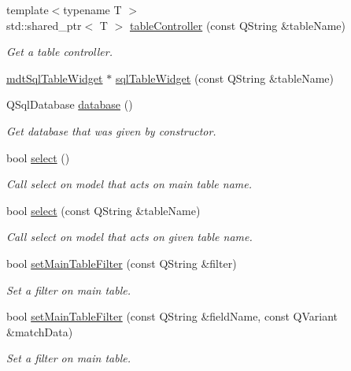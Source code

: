 \begin{DoxyCompactItemize}
{\footnotesize template$<$typename T $>$ }\\std\-::shared\-\_\-ptr$<$ T $>$ \hyperlink{classmdt_sql_form_ae812518bc0c786b918dbc63bc8a69741}{table\-Controller} (const Q\-String \&table\-Name)
\begin{DoxyCompactList}\small\item\em Get a table controller. \end{DoxyCompactList}\item 
\hyperlink{classmdt_sql_table_widget}{mdt\-Sql\-Table\-Widget} $\ast$ \hyperlink{classmdt_sql_form_a6a17f32077fb7cc33139c3dc26a8d011}{sql\-Table\-Widget} (const Q\-String \&table\-Name)
\item 
Q\-Sql\-Database \hyperlink{classmdt_sql_form_ac8423f91a1f8a6fa7408cd61be86a89c}{database} ()
\begin{DoxyCompactList}\small\item\em Get database that was given by constructor. \end{DoxyCompactList}\item 
bool \hyperlink{classmdt_sql_form_a2a2f564fe934cc8997b07f90abb771e1}{select} ()
\begin{DoxyCompactList}\small\item\em Call select on model that acts on main table name. \end{DoxyCompactList}\item 
bool \hyperlink{classmdt_sql_form_ae9a1f8c03e5ac8ccd01fa804356abd01}{select} (const Q\-String \&table\-Name)
\begin{DoxyCompactList}\small\item\em Call select on model that acts on given table name. \end{DoxyCompactList}\item 
bool \hyperlink{classmdt_sql_form_a86c870d9875efbd83262f5dd28df5177}{set\-Main\-Table\-Filter} (const Q\-String \&filter)
\begin{DoxyCompactList}\small\item\em Set a filter on main table. \end{DoxyCompactList}\item 
bool \hyperlink{classmdt_sql_form_abfc6d7f49debf02f5016923cbd422f2f}{set\-Main\-Table\-Filter} (const Q\-String \&field\-Name, const Q\-Variant \&match\-Data)
\begin{DoxyCompactList}\small\item\em Set a filter on main table. \end{DoxyCompactList}\item 

\end{DoxyCompactItemize}
